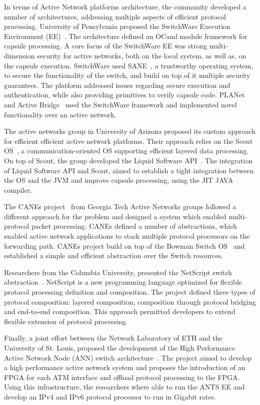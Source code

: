 In terms of Active Network platforms architecture, the community developed a
number of architectures, addressing multiple aspects of efficient protocol
processing. University of Pensylvania proposed the SwitchWare Execution
Environment (EE)~\cite{Alexander1998}.  The architecture defined an OCaml module
framework for capsule processing. A core focus of the SwitchWare EE was strong
multi-dimension security for active networks, both on the local system, as well as, on
the capsule execution.  SwitchWare used SANE~\cite{Alexander1998b}, a
trustworthy operating system, to secure the functionality of the switch, and
build on top of it multiple security guarantees. The platform addressed issues
regarding secure execution and authentication, while also providing primitives
to verify capsule code.
PLANet~\cite{Hicks1999} and Active Bridge~\cite{Alexander1997b} used the
SwitchWare framework and implemented novel functionality over an active network. 

The active networks group in University of Arizona proposed its custom approach
for efficient efficient active network platforms. Their approach relies on the Scout
OS~\cite{Montz1995}, a communication-oriented OS supporting efficient
layered data processing. On top of Scout, the group developed the Liquid Software
API~\cite{Hartman1999}. The integration of Liquid Software API and Scout, aimed to
establish a tight integration between the OS and the JVM and improve capsule
processing, using the JIT JAVA compiler. 

The CANEs project~\cite{Chae2002} from Georgia Tech Active Networks groups
followed a different approach for the problem and designed a system which
enabled multi-protocol packet processing. CANEs defined a number of
abstractions, which enabled active network applications to stack multiple
protocol processors on the forwarding path. CANEs project build on top of the
Bowman Switch OS~\cite{merugu1999} and established a simple and efficient
abstraction over the Switch resources. 

Researchers from the Columbia University, presented the NetScript switch
abstraction~\cite{daSilva2001}. NetScript is a new programming language
optimized for flexible protocol processing definition and composition. The
project defined three types of protocol composition: layered composition,
composition through protocol bridging and end-to-end composition. This approach 
permitted developers to extend flexible extension of protocol processing. 

Finally, a joint effort between the Network Laboratory of ETH and the University
of St. Louis, proposed the development of the High Performance Active Network
Node (ANN) switch architecture~\cite{Decasper1999}. The project aimed to develop a high performance
active network system and proposes the introduction of an FPGA for each ATM
interface and offload protocol processing to the FPGA. Using this
infrastructure, the researchers where able to run the ANTS EE and develop an
IPv4 and IPv6 protocol processor to run in Gigabit rates. 

